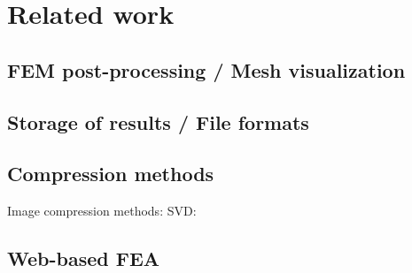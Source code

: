 \chapter{Related work}
\label{chapter:related-work}


\section{FEM post-processing / Mesh visualization}


\section{Storage of results / File formats}


\cite{VTK2015}
\cite{GiDPostProcess}
\newline
\cite{Ivanyi2012}


\section{Compression methods}

Image compression methods:
\cite{Lui2001}
\cite{Watson1994}
\newline
SVD: \cite{Baker2005, Kalman1996, Golub1996}

\section{Web-based FEA}

\cite{Ari2013}
\cite{Yu2010}
\cite{Peng2003}
\cite{Heber2007I}
\cite{Heber2007II}
\cite{Weng2011}
\cite{Chen2008}

